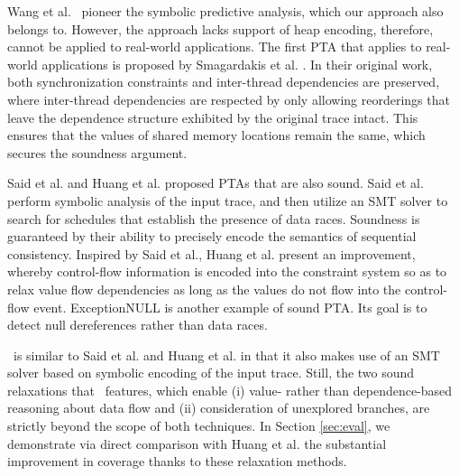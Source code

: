 Wang et al.~\cite{chao} pioneer the symbolic predictive analysis, 
which our approach also belongs to. However, the approach lacks support 
of heap encoding, therefore, cannot be applied to real-world applications. 
The first PTA that applies to real-world applications is proposed by 
Smagardakis et al. \cite{yannis}. In their original work, both synchronization 
constraints and inter-thread dependencies are preserved, where inter-thread 
dependencies are respected by only allowing reorderings that leave the 
dependence structure exhibited by the original trace intact. This ensures 
that the values of shared memory locations remain the same, which secures 
the soundness argument.

Said et al. \cite{Said:2011} and Huang et al. \cite{pldi14} proposed
PTAs that are also sound. Said et al. perform symbolic analysis of the 
input trace, and then utilize an SMT solver to search for schedules that 
establish the presence of data races. Soundness is guaranteed by their 
ability to precisely encode the semantics of sequential consistency. 
Inspired by Said et al., Huang et al. present an improvement, whereby 
control-flow information is encoded into the constraint system so as 
to relax value flow dependencies as long as the values do not flow into the control-flow event.
 ExceptionNULL \cite{Farzan:2012} is another example of 
sound PTA. Its goal is to detect null dereferences rather than data races. 

\tool\ is similar to Said et al. and Huang et al. in that it also makes 
use of an SMT solver based on symbolic encoding of the input 
trace. Still, the two sound relaxations that \tool\ features, which 
enable (i) value- rather than dependence-based reasoning about data 
flow and (ii) consideration of unexplored branches, are strictly beyond
the scope of both techniques. In Section \ref{sec:eval}, we demonstrate 
via direct comparison with Huang et al. the substantial improvement 
in coverage thanks to these relaxation methods.

